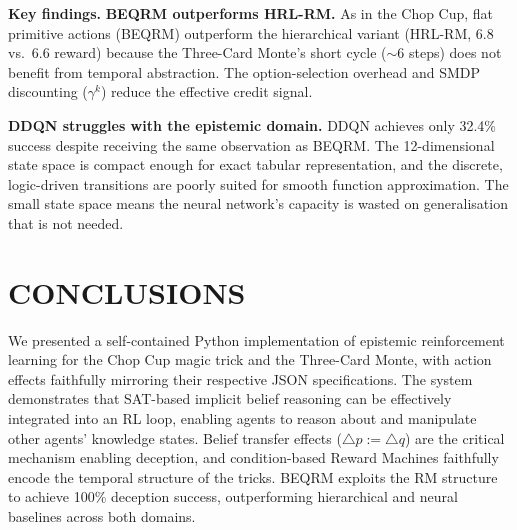 \documentclass[letterpaper, 10 pt, conference]{ieeeconf}  %
\begin{document}
\textbf{Key findings.}
\textbf{BEQRM outperforms HRL-RM.}
As in the Chop Cup, flat primitive actions (BEQRM) outperform the hierarchical variant (HRL-RM, 6.8 vs.\ 6.6 reward) because the Three-Card Monte's short cycle ($\sim$6 steps) does not benefit from temporal abstraction.
The option-selection overhead and SMDP discounting ($\gamma^k$) reduce the effective credit signal.

\textbf{DDQN struggles with the epistemic domain.}
DDQN achieves only 32.4\% success despite receiving the same observation as BEQRM.
The 12-dimensional state space is compact enough for exact tabular representation, and the discrete, logic-driven transitions are poorly suited for smooth function approximation.
The small state space means the neural network's capacity is wasted on generalisation that is not needed.

\section{CONCLUSIONS}

We presented a self-contained Python implementation of epistemic reinforcement learning for the Chop Cup magic trick and the Three-Card Monte, with action effects faithfully mirroring their respective JSON specifications. The system demonstrates that SAT-based implicit belief reasoning can be effectively integrated into an RL loop, enabling agents to reason about and manipulate other agents' knowledge states. Belief transfer effects ($\triangle p := \triangle q$) are the critical mechanism enabling deception, and condition-based Reward Machines faithfully encode the temporal structure of the tricks. BEQRM exploits the RM structure to achieve 100\% deception success, outperforming hierarchical and neural baselines across both domains.

\end{document}
